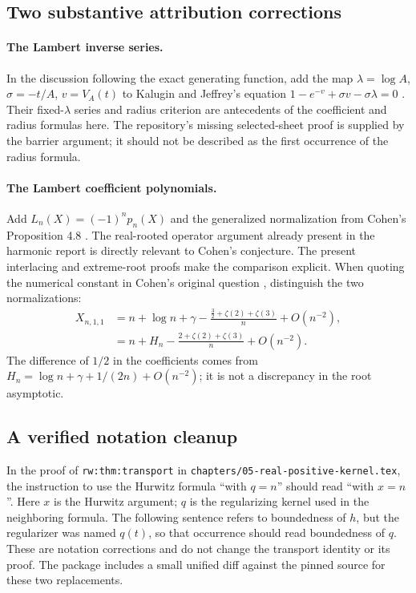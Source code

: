 \subsection{Two substantive attribution corrections}

\paragraph{The Lambert inverse series.}
In the discussion following the exact generating function, add the
map $\lambda=\log A$, $\sigma=-t/A$, $v=V_A(t)$ to
Kalugin and Jeffrey's equation
$1-e^{-v}+\sigma v-\sigma\lambda=0$
\cite{KaluginJeffrey2012}. Their fixed-$\lambda$ series and radius
criterion are antecedents of the coefficient and radius formulas here.
The repository's missing selected-sheet proof is supplied by the
barrier argument; it should not be described as the first occurrence
of the radius formula.

\paragraph{The Lambert coefficient polynomials.}
Add $L_n(X)=(-1)^np_n(X)$ and the generalized normalization from
Cohen's Proposition 4.8 \cite{Cohen2021}. The real-rooted operator
argument already present in the harmonic report is directly relevant
to Cohen's conjecture. The present interlacing and extreme-root proofs
make the comparison explicit. When quoting the numerical constant in
Cohen's original question \cite{CohenMO2020}, distinguish the two
normalizations:
\begin{align*}
 X_{n,1,1}
 &=n+\log n+\gamma
       -\frac{\frac32+\zeta(2)+\zeta(3)}n+O(n^{-2}),\\
 &=n+H_n
       -\frac{2+\zeta(2)+\zeta(3)}n+O(n^{-2}).
\end{align*}
The difference of $1/2$ in the coefficients comes from
$H_n=\log n+\gamma+1/(2n)+O(n^{-2})$; it is not a discrepancy in
the root asymptotic.

\subsection{A verified notation cleanup}

In the proof of \texttt{rw:thm:transport} in
\nolinkurl{chapters/05-real-positive-kernel.tex}, the instruction to
use the Hurwitz formula ``with $q=n$'' should read ``with $x=n$''.
Here $x$ is the Hurwitz argument; $q$ is the regularizing kernel used
in the neighboring formula. The following sentence refers to boundedness
of $h$, but the regularizer was named $q(t)$, so that occurrence should
read boundedness of $q$. These are notation corrections and do not
change the transport identity or its proof. The package includes a
small unified diff against the pinned source for these two replacements.


